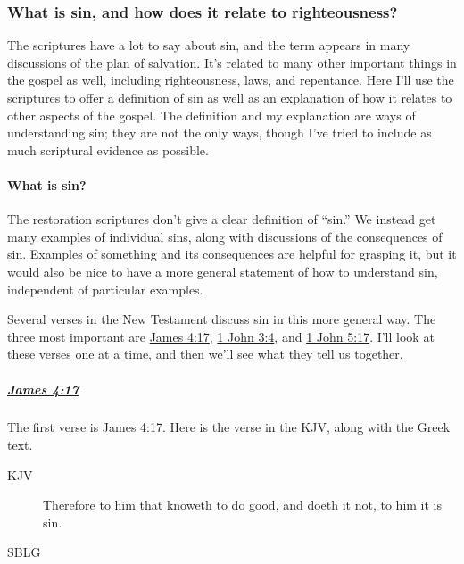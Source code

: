 	\subsubsection{What is sin, and how does it relate to righteousness?}
		\label{SIN-definition}
		
		The scriptures have a lot to say about sin,
			and the term appears in many discussions of the plan of salvation.
		It's related to many other important things in the gospel as well,
			including righteousness,
				laws,
					and repentance.
		Here I'll use the scriptures to offer a definition of sin as well as an explanation of how it relates to other aspects of the gospel.
		The definition and my explanation are ways of understanding sin;
			they are not the only ways,
				though I've tried to include as much scriptural evidence as possible.
		
		\paragraph{What is sin?}
		
			The restoration scriptures don't give a clear definition of ``sin.''
			We instead get many examples of individual sins,
				along with discussions of the consequences of sin.
			Examples of something and its consequences are helpful for grasping it,
				but it would also be nice to have a more general statement of how to understand sin,
					independent of particular examples.
			
			Several verses in the New Testament discuss sin in this more general way.
			The three most important are \hyperref[JAMES-4-17]{James 4:17},
				\hyperref[1JOHN-3-4]{1 John 3:4},
					and \hyperref[1JOHN-5-17]{1 John 5:17}.
			I'll look at these verses one at a time,
				and then we'll see what they tell us together.
				
			\subparagraph{\hyperref[JAMES-4-17]{James 4:17}}
				\label{SIN-james-4-17}
			
				The first verse is James 4:17.
				Here is the verse in the KJV,
					along with the Greek text.
					
					\begin{description}
						\item[KJV] Therefore to him that knoweth to do good, and doeth it not, to him it is sin.
						\item[SBLG] 
					\end{description}
				
